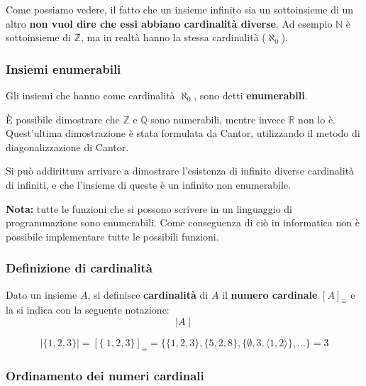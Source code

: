 \documentclass[
  a4paper,
]{article}
\begin{document}
Come possiamo vedere, il fatto che un insieme infinito sia un
sottoinsieme di un altro \textbf{non vuol dire che essi abbiano
cardinalità diverse}. Ad esempio \(\mathbb{N}\) è sottoinsieme di
\(\mathbb{Z}\), ma in realtà hanno la stessa cardinalità (\(\aleph_0\)).

\hypertarget{insiemi-enumerabili}{%
\subsubsection{Insiemi enumerabili}\label{insiemi-enumerabili}}

Gli insiemi che hanno come cardinalità \(\aleph_0\), sono detti
\textbf{enumerabili}.

È possibile dimostrare che \(\mathbb{Z}\) e \(\mathbb{Q}\) sono
numerabili, mentre invece \(\mathbb{R}\) non lo è. Quest'ultima
dimostrazione è stata formulata da Cantor, utilizzando il metodo di
diagonalizzazione di Cantor.

Si può addirittura arrivare a dimostrare l'esistenza di infinite diverse
cardinalità di infiniti, e che l'insieme di queste è un infinito non
enumerabile.

\textbf{Nota:} tutte le funzioni che si possono scrivere in un
linguaggio di programmazione sono enumerabili. Come conseguenza di ciò
in informatica non è possibile implementare tutte le possibili funzioni.

\hypertarget{definizione-di-cardinalituxe0}{%
\subsubsection{Definizione di
cardinalità}\label{definizione-di-cardinalituxe0}}

Dato un insieme \(A\), si definisce \textbf{cardinalità} di \(A\) il
\textbf{numero cardinale} \([A]_\equiv\) e la si indica con la seguente
notazione: \[
\mid A \mid
\]

\begin{examplebox}[Esempio]

\[
|\{1, 2, 3\} | = [\{\ 1, 2, 3\}]_\equiv = \{\{1, 2, 3\}, \{5, 2, 8\}, \{\emptyset, 3, \langle 1, 2 \rangle \}, \dots\} = 3
\]

\end{examplebox}

\hypertarget{ordinamento-dei-numeri-cardinali}{%
\subsubsection{Ordinamento dei numeri
cardinali}\label{ordinamento-dei-numeri-cardinali}}
\end{document}
